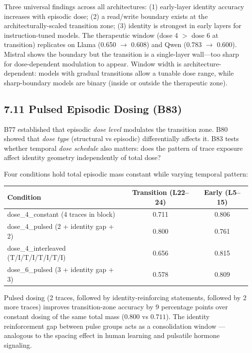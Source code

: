 \documentclass[11pt]{article}
\begin{document}
Three universal findings across all architectures: (1) early-layer identity
accuracy increases with episodic dose; (2) a read/write boundary exists at the
architecturally-scaled transition zone; (3) identity is strongest in early layers
for instruction-tuned models. The therapeutic window (dose 4 $>$ dose 6 at
transition) replicates on Llama (0.650 $\to$ 0.608) and Qwen (0.783 $\to$ 0.600).
Mistral shows the boundary but the transition is a single-layer wall---too sharp
for dose-dependent modulation to appear. Window width is architecture-dependent:
models with gradual transitions allow a tunable dose range, while sharp-boundary
models are binary (inside or outside the therapeutic zone).


\subsection{7.11 Pulsed Episodic Dosing (B83)}

B77 established that episodic \textit{dose level} modulates the transition zone.
B80 showed that \textit{dose type} (structural vs episodic) differentially affects
it. B83 tests whether temporal \textit{dose schedule} also matters: does the
pattern of trace exposure affect identity geometry independently of total dose?

Four conditions hold total episodic mass constant while varying temporal pattern:

\begin{center}
\begin{tabular}{lcc}
\toprule
Condition & Transition (L22--24) & Early (L5--15) \\
\midrule
dose\_4\_constant (4 traces in block) & 0.711 & 0.806 \\
dose\_4\_pulsed (2 + identity gap + 2) & 0.800 & 0.761 \\
dose\_4\_interleaved (T/I/T/I/T/I/T/I) & 0.656 & 0.815 \\
dose\_6\_pulsed (3 + identity gap + 3) & 0.578 & 0.809 \\
\bottomrule
\end{tabular}
\end{center}

Pulsed dosing (2 traces, followed by identity-reinforcing statements, followed by
2 more traces) improves transition-zone accuracy by 9 percentage points over
constant dosing of the same total mass ($0.800$ vs $0.711$). The identity
reinforcement gap between pulse groups acts as a consolidation window ---
analogous to the spacing effect in human learning and pulsatile hormone signaling.
\end{document}
